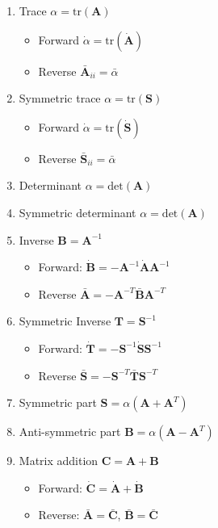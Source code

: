\documentclass{article}
\begin{document}
\begin{enumerate}
\item Trace $\alpha = \text{tr}(\mathbf{A})$
\begin{itemize}
\item Forward $\dot{\alpha} = \text{tr}(\dot{\mathbf{A}})$
\item Reverse $\bar{\mathbf{A}}_{ii} = \bar{\alpha}$
\end{itemize}

\item Symmetric trace $\alpha = \text{tr}(\mathbf{S})$
\begin{itemize}
\item Forward $\dot{\alpha} = \text{tr}(\dot{\mathbf{S}})$
\item Reverse $\bar{\mathbf{S}}_{ii} = \bar{\alpha}$
\end{itemize}

\item Determinant $\alpha = \text{det}(\mathbf{A})$
\item Symmetric determinant $\alpha = \text{det}(\mathbf{A})$

\item Inverse $\mathbf{B} = \mathbf{A}^{-1}$
\begin{itemize}
\item Forward: $\dot{\mathbf{B}} = - \mathbf{A}^{-1} \dot{\mathbf{A}} \mathbf{A}^{-1}$
\item Reverse $\bar{\mathbf{A}} = - \mathbf{A}^{-T} \bar{\mathbf{B}} \mathbf{A}^{-T}$
\end{itemize}

\item Symmetric Inverse $\mathbf{T} = \mathbf{S}^{-1}$
\begin{itemize}
\item Forward: $\dot{\mathbf{T}} = - \mathbf{S}^{-1} \dot{\mathbf{S}} \mathbf{S}^{-1}$
\item Reverse $\bar{\mathbf{S}} = - \mathbf{S}^{-T} \bar{\mathbf{T}} \mathbf{S}^{-T}$
\end{itemize}

\item Symmetric part $\mathbf{S} = \alpha(\mathbf{A} + \mathbf{A}^{T})$
\item Anti-symmetric part $\mathbf{B} = \alpha (\mathbf{A} - \mathbf{A}^{T})$

\item Matrix addition $\mathbf{C} = \mathbf{A} + \mathbf{B}$
\begin{itemize}
\item Forward: $\dot{\mathbf{C}} =  \dot{\mathbf{A}} + \dot{\mathbf{B}}$
\item Reverse: $\bar{\mathbf{A}} =  \bar{\mathbf{C}}$, $\bar{\mathbf{B}} = \bar{\mathbf{C}}$
\end{itemize}


\end{enumerate}
\end{document}
